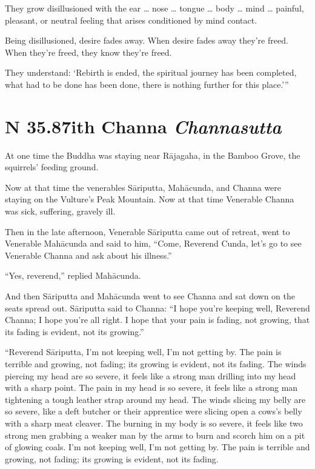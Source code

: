 \documentclass[12pt,openany]{book}%
\newcommand*{\suttatitleacronym}[1]{\smaller[2]{#1}\vspace*{.3em}}
\newcommand*{\suttatitletranslation}[1]{\linebreak{#1}}
\newcommand*{\suttatitleroot}[1]{\linebreak\smaller[2]\itshape{#1}}
\newcommand*{\tocacronym}[1]{\hspace*{-3.3em}{#1}\quad}
\newcommand*{\toctranslation}[1]{#1}
\newcommand*{\tocroot}[1]{(\textit{#1})}
\begin{document}
They grow disillusioned with the ear … nose … tongue … body … mind … painful, pleasant, or neutral feeling that arises conditioned by mind contact. 

Being disillusioned, desire fades away. When desire fades away they’re freed. When they’re freed, they know they’re freed. 

They understand: ‘Rebirth is ended, the spiritual journey has been completed, what had to be done has been done, there is nothing further for this place.’” 

%
\section*{{\suttatitleacronym SN 35.87}{\suttatitletranslation With Channa }{\suttatitleroot Channasutta}}
\addcontentsline{toc}{section}{\tocacronym{SN 35.87} \toctranslation{With Channa } \tocroot{Channasutta}}

At one time the Buddha was staying near \textsanskrit{Rājagaha}, in the Bamboo Grove, the squirrels’ feeding ground. 

Now at that time the venerables \textsanskrit{Sāriputta}, \textsanskrit{Mahācunda}, and Channa were staying on the Vulture’s Peak Mountain. Now at that time Venerable Channa was sick, suffering, gravely ill. 

Then in the late afternoon, Venerable \textsanskrit{Sāriputta} came out of retreat, went to Venerable \textsanskrit{Mahācunda} and said to him, “Come, Reverend Cunda, let’s go to see Venerable Channa and ask about his illness.” 

“Yes, reverend,” replied \textsanskrit{Mahācunda}. 

And then \textsanskrit{Sāriputta} and \textsanskrit{Mahācunda} went to see Channa and sat down on the seats spread out. \textsanskrit{Sāriputta} said to Channa: “I hope you’re keeping well, Reverend Channa; I hope you’re all right. I hope that your pain is fading, not growing, that its fading is evident, not its growing.” 

“Reverend \textsanskrit{Sāriputta}, I’m not keeping well, I’m not getting by. The pain is terrible and growing, not fading; its growing is evident, not its fading. The winds piercing my head are so severe, it feels like a strong man drilling into my head with a sharp point. The pain in my head is so severe, it feels like a strong man tightening a tough leather strap around my head. The winds slicing my belly are so severe, like a deft butcher or their apprentice were slicing open a cows’s belly with a sharp meat cleaver. The burning in my body is so severe, it feels like two strong men grabbing a weaker man by the arms to burn and scorch him on a pit of glowing coals. I’m not keeping well, I’m not getting by. The pain is terrible and growing, not fading; its growing is evident, not its fading. 
\end{document}
